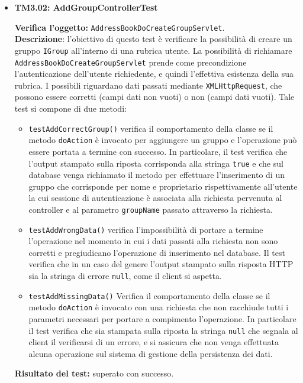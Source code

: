 \begin{itemize}
\item \textbf{TM3.02: AddGroupControllerTest}

\textbf{Verifica l'oggetto:} \texttt{AddressBookDoCreateGroupServlet}.\\
\textbf{Descrizione}: l'obiettivo di questo test è verificare la possibilità di creare un gruppo \texttt{IGroup} all'interno di una rubrica utente. La possibilità di richiamare \\ \texttt{AddressBookDoCreateGroupServlet} prende come precondizione l'autenticazione dell'utente richiedente, e quindi l'effettiva esistenza della sua rubrica. I possibili  riguardano dati passati mediante \texttt{XMLHttpRequest}, che possono essere corretti (campi dati non vuoti) o non (campi dati vuoti). %
Tale test si compone di due metodi:
\begin{itemize}
\item \texttt{testAddCorrectGroup()} verifica il comportamento della classe se il metodo \texttt{doAction} è invocato per aggiungere un gruppo e l'operazione può essere portata a termine con successo. In particolare, il test verifica che l'output stampato sulla riposta corrisponda alla stringa \texttt{true} e che sul database venga richiamato il metodo per effettuare l'inserimento di un gruppo che corrisponde per nome e proprietario rispettivamente all'utente la cui sessione di autenticazione è associata alla richiesta pervenuta al controller e al parametro \texttt{groupName} passato attraverso la richiesta.

\item \texttt{testAddWrongData()} verifica l'impossibilità di portare a termine l'operazione nel momento in cui i dati passati alla richiesta non sono corretti e pregiudicano l'operazione di inserimento nel database. Il test verifica che in un caso del genere l'output stampato sulla risposta HTTP sia la stringa di errore \texttt{null}, come il client si aspetta.

\item \texttt{testAddMissingData()} Verifica il comportamento della classe se il metodo \texttt{doAction} è invocato con una richiesta che non racchiude tutti i parametri necessari per portare a compimento l'operazione. In particolare il test verifica che sia stampata sulla riposta la stringa \texttt{null} che segnala al client il verificarsi di un errore, e si assicura che non venga effettuata alcuna operazione sul sistema di gestione della persistenza dei dati.
\end{itemize}
\textbf{Risultato del test:} superato con successo.


\end{itemize}
